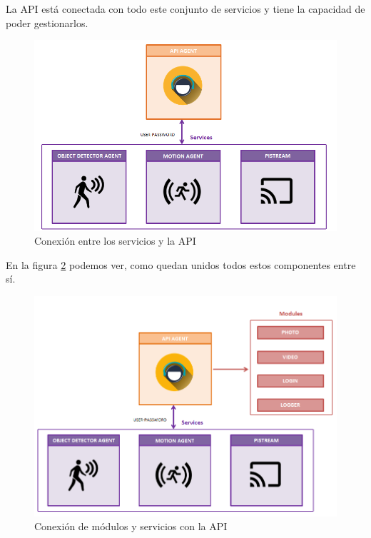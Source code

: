 La API está conectada con todo este conjunto de servicios y tiene la capacidad de poder gestionarlos.

\begin{figure}[h]
	\centering
	\includegraphics[scale=0.35]{images/28}
	\caption{Conexión entre los servicios y la API}
	\label{img:conexionserviciosapi}
\end{figure}

En la figura \ref{img:conexionmodulosserviciosapi} podemos ver, como quedan unidos todos estos componentes entre sí.

\newpage


\begin{figure}[h]
	\centering
	\includegraphics[scale=0.35]{images/35}
	\caption{Conexión de módulos y servicios con la API}
	\label{img:conexionmodulosserviciosapi}
\end{figure}

